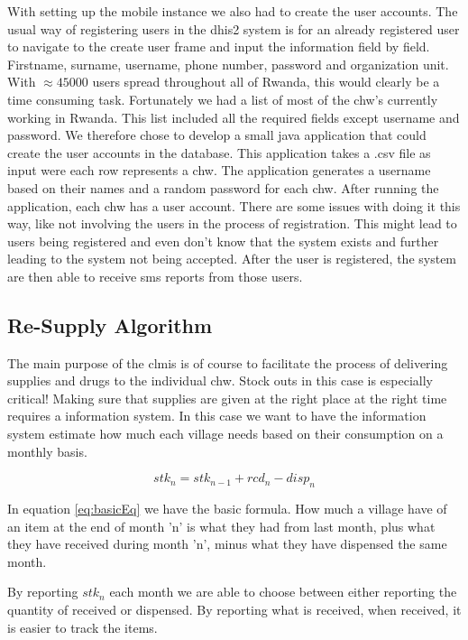 With setting up the mobile instance we also had to create the user accounts. 
The usual way of registering users in the \gls{dhis2} system is for an already registered user to navigate to the create user frame and input the information field by field. Firstname, surname, username, phone number, password and organization unit. With $\approx 45000$ users spread throughout all of Rwanda, this would clearly be a time consuming task. Fortunately we had a list of most of the \gls{chw}'s currently working in Rwanda. This list included all the required fields except username and password. We therefore chose to develop a small java application that could create the user accounts in the database. This application takes a .csv file as input were each row represents a \gls{chw}. The application generates a username based on their names and a random password for each \gls{chw}. After running the application, each \gls{chw} has a user account. There are some issues with doing it this way, like not involving the users in the process of registration. This might lead to users being registered and even don't know that the system exists and further leading to the system not being accepted. After the user is registered, the system are then able to receive \gls{sms} reports from those users. 

\subsection{Re-Supply Algorithm}
The main purpose of the \gls{clmis} is of course to facilitate the process of delivering supplies and drugs to the individual \gls{chw}. Stock outs in this case is especially critical! Making sure that supplies are given at the right place at the right time requires a information system. In this case we want to have the information system estimate how much each village needs based on their consumption on a monthly basis. 

\begin{equation}
stk_{n} = stk_{n-1} + rcd_{n} - disp_{n}
\label{eq:basicEq}
\end{equation}

In equation \ref{eq:basicEq} we have the basic formula. How much a village have of an item at the end of month 'n' is what they had from last month, plus what they have received during month 
'n', minus what they have dispensed the same month. 

By reporting $stk_{n}$ each month we are able to choose between either reporting the quantity of received or dispensed. By reporting what is received, when received, it is easier to track the items. 

